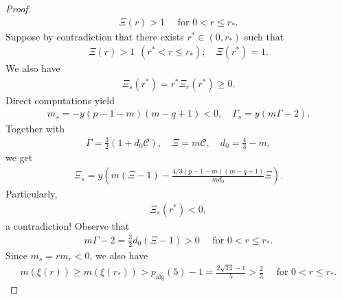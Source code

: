 \documentclass{article}
\theoremstyle{definition} \theoremstyle{remark}
\numberwithin{equation}{section}
\begin{document}
\begin{proof}
\begin{align*}
			\Xi(r) > 1 \quad \text{ for } 0 < r \le r_*.
		\end{align*}
		Suppose by contradiction that there exists $r^* \in (0,r_*)$ such that
		\begin{align*}
			\Xi(r) > 1 ~~ (r^* < r \le r_*); \quad \Xi(r^*) = 1.
		\end{align*}
		We also have
		\begin{align*}
			\Xi_s(r^*) = r^*\Xi_r(r^*) \ge 0.
		\end{align*}
		Direct computations yield
		\begin{align*}
			m_s = -y(p-1-m)(m-q+1) < 0, \quad \Gamma_s = y(m\Gamma -2).
		\end{align*}
		Together with
		\begin{align*}
			\Gamma = \frac{3}{2}(1 + d_0\mathscr{C}), \quad \Xi = m\mathscr{C}, \quad d_0 = \frac{4}{3} - m,
		\end{align*}
		we get
		\begin{align*}
			\Xi_s = y\left(m(\Xi - 1) - \frac{4/3(p-1-m)(m-q+1)}{md_0}\Xi\right).
		\end{align*}
		Particularly,
		\begin{align*}
			\Xi_s(r^*) < 0,
		\end{align*}
		a contradiction! Observe that
		\begin{align} \label{mg-2>0}
			m\Gamma - 2 = \frac{3}{2}d_0(\Xi-1) > 0 \quad \text{ for } 0 < r \le r_*.
		\end{align}
		Since $m_s = rm_r < 0$, we also have
		\begin{align} \label{m>23}
			m(\xi(r)) \ge m(\xi(r_*)) > p_{\text{alg}}(5) - 1 = \frac{2\sqrt{14} - 1}{5} > \frac23 \quad \text{ for } 0 < r \le r_*.
		\end{align}


\end{proof}
\end{document}
